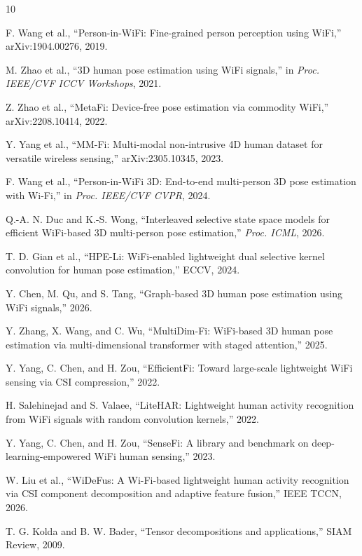 \documentclass[10pt,conference]{IEEEtran}
\begin{document}

\begin{thebibliography}{10}

F. Wang et al., ``Person-in-WiFi: Fine-grained person perception using WiFi,'' arXiv:1904.00276, 2019.

M. Zhao et al., ``3D human pose estimation using WiFi signals,'' in \emph{Proc. IEEE/CVF ICCV Workshops}, 2021.

Z. Zhao et al., ``MetaFi: Device-free pose estimation via commodity WiFi,'' arXiv:2208.10414, 2022.

Y. Yang et al., ``MM-Fi: Multi-modal non-intrusive 4D human dataset for versatile wireless sensing,'' arXiv:2305.10345, 2023.

F. Wang et al., ``Person-in-WiFi 3D: End-to-end multi-person 3D pose estimation with Wi-Fi,'' in \emph{Proc. IEEE/CVF CVPR}, 2024.

Q.-A. N. Duc and K.-S. Wong, ``Interleaved selective state space models for efficient WiFi-based 3D multi-person pose estimation,'' \emph{Proc. ICML}, 2026.

T. D. Gian et al., ``HPE-Li: WiFi-enabled lightweight dual selective kernel convolution for human pose estimation,'' ECCV, 2024.

Y. Chen, M. Qu, and S. Tang, ``Graph-based 3D human pose estimation using WiFi signals,'' 2026.

Y. Zhang, X. Wang, and C. Wu, ``MultiDim-Fi: WiFi-based 3D human pose estimation via multi-dimensional transformer with staged attention,'' 2025.

Y. Yang, C. Chen, and H. Zou, ``EfficientFi: Toward large-scale lightweight WiFi sensing via CSI compression,'' 2022.

H. Salehinejad and S. Valaee, ``LiteHAR: Lightweight human activity recognition from WiFi signals with random convolution kernels,'' 2022.

Y. Yang, C. Chen, and H. Zou, ``SenseFi: A library and benchmark on deep-learning-empowered WiFi human sensing,'' 2023.

W. Liu et al., ``WiDeFus: A Wi-Fi-based lightweight human activity recognition via CSI component decomposition and adaptive feature fusion,'' IEEE TCCN, 2026.

T. G. Kolda and B. W. Bader, ``Tensor decompositions and applications,'' SIAM Review, 2009.

\end{thebibliography}
\end{document}
